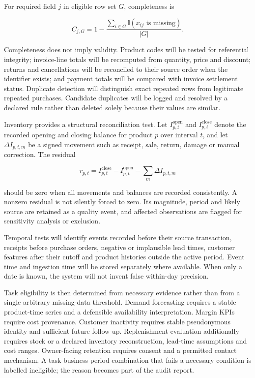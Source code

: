 For required field $j$ in eligible row set $G$, completeness is

\begin{equation}
C_{j,G}=1-\frac{\sum_{i\in G}\mathbb{I}(x_{ij}\text{ is missing})}{|G|}.
\label{eq:completeness}
\end{equation}

Completeness does not imply validity. Product codes will be tested for referential
integrity; invoice-line totals will be recomputed from quantity, price and
discount; returns and cancellations will be reconciled to their source order
when the identifier exists; and payment totals will be compared with invoice
settlement status. Duplicate detection will distinguish exact repeated rows
from legitimate repeated purchases. Candidate duplicates will be logged and
resolved by a declared rule rather than deleted solely because their values are
similar.

Inventory provides a structural reconciliation test. Let
$I^{\mathrm{open}}_{p,t}$ and $I^{\mathrm{close}}_{p,t}$ denote the recorded
opening and closing balance for product $p$ over interval $t$, and let
$\Delta I_{p,t,m}$ be a signed movement such as receipt, sale, return, damage or
manual correction. The residual

\begin{equation}
r_{p,t}=I^{\mathrm{close}}_{p,t}-I^{\mathrm{open}}_{p,t}
-\sum_m \Delta I_{p,t,m}
\label{eq:stock_reconciliation}
\end{equation}

should be zero when all movements and balances are recorded consistently. A
nonzero residual is not silently forced to zero. Its magnitude, period and
likely source are retained as a quality event, and affected observations are
flagged for sensitivity analysis or exclusion.

Temporal tests will identify events recorded before their source transaction,
receipts before purchase orders, negative or implausible lead times, customer
features after their cutoff and product histories outside the active period.
Event time and ingestion time will be stored separately where available. When
only a date is known, the system will not invent false within-day precision.

Task eligibility is then determined from necessary evidence rather than from a
single arbitrary missing-data threshold. Demand forecasting requires a stable
product-time series and a defensible availability interpretation. Margin KPIs
require cost provenance. Customer inactivity requires stable pseudonymous
identity and sufficient future follow-up. Replenishment evaluation additionally
requires stock or a declared inventory reconstruction, lead-time assumptions
and cost ranges. Owner-facing retention requires consent and a permitted contact
mechanism. A task-business-period combination that fails a necessary condition
is labelled ineligible; the reason becomes part of the audit report.

